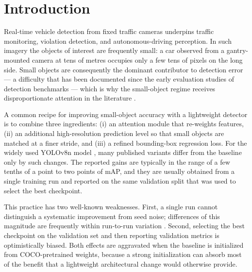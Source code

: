 \documentclass[pdflatex,sn-basic,Numbered]{sn-jnl}%
\begin{document}

\maketitle

\section{Introduction}\label{sec:intro}

Real-time vehicle detection from fixed traffic cameras underpins traffic monitoring, violation detection, and autonomous-driving perception. In such imagery the objects of interest are frequently small: a car observed from a gantry-mounted camera at tens of metres occupies only a few tens of pixels on the long side. Small objects are consequently the dominant contributor to detection error --- a difficulty that has been documented since the early evaluation studies of detection benchmarks \cite{dollar2012pedestrian} --- which is why the small-object regime receives disproportionate attention in the literature \cite{lin2017focal,cheng2023smallobject,kisantal2019augmentation,akyon2022sahi}.

A common recipe for improving small-object accuracy with a lightweight detector is to combine three ingredients: (i) an attention module that re-weights features, (ii) an additional high-resolution prediction level so that small objects are matched at a finer stride, and (iii) a refined bounding-box regression loss. For the widely used YOLOv8n model \cite{jocher2023ultralytics}, many published variants differ from the baseline only by such changes. The reported gains are typically in the range of a few tenths of a point to two points of mAP, and they are usually obtained from a single training run and reported on the same validation split that was used to select the best checkpoint.

This practice has two well-known weaknesses. First, a single run cannot distinguish a systematic improvement from seed noise; differences of this magnitude are frequently within run-to-run variation \cite{beyer2020imagenet,dietterich1998tests,demsar2006statistical}. Second, selecting the best checkpoint on the validation set and then reporting validation metrics is optimistically biased. Both effects are aggravated when the baseline is initialized from COCO-pretrained weights, because a strong initialization can absorb most of the benefit that a lightweight architectural change would otherwise provide.
\end{document}
